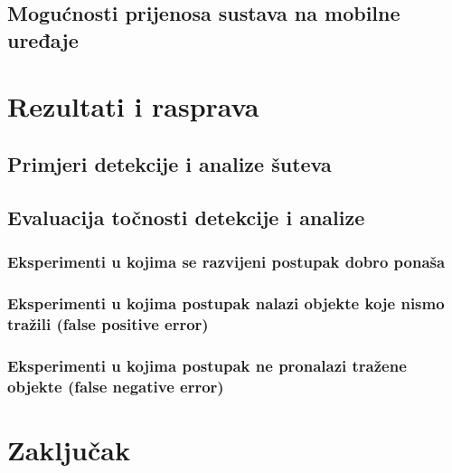 \documentclass[zavrsnirad]{fer}
\begin{document}
\section{Mogućnosti prijenosa sustava na mobilne uređaje}
\label{pog:mogucnosti_prijenosa_sustava_na_mobilne_uredaje}


\chapter{Rezultati i rasprava}
\label{pog:rezultati_i_rasprava}

\section{Primjeri detekcije i analize šuteva}
\label{pog:primjeri_detekcije_i_analize_suteva}
\section{Evaluacija točnosti detekcije i analize}
\label{pog:evaluacija_tocnosti_detekcije_i_analize}
\subsection{Eksperimenti u kojima se razvijeni postupak dobro ponaša}
\label{pog:eksperimenti_u_kojima_se_razvijeni_postupak_dobro_ponasa}
\subsection{Eksperimenti u kojima postupak nalazi objekte koje nismo tražili (false positive error)}
\label{pog:eksperimenti_u_kojima_postupak_nalazi_objekte_koje_nismo_trazili}

\subsection{Eksperimenti u kojima postupak ne pronalazi tražene objekte (false negative error)}
\label{pog:eksperimenti_u_kojima_postupak_ne_pronalazi_trazene_objekte}


\chapter{Zaključak}
\label{pog:zakljucak}

\blindtext
\end{document}
